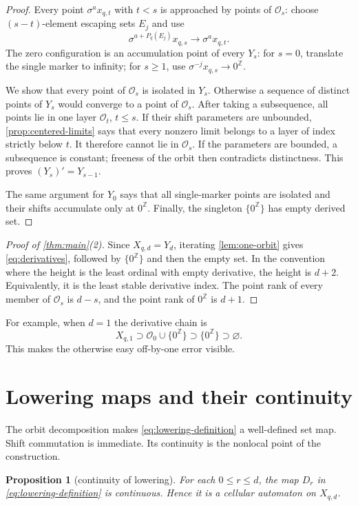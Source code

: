 \documentclass[11pt,a4paper]{amsart}
\newtheorem{proposition}[theorem]{Proposition}
\theoremstyle{definition}
\theoremstyle{remark}
\newcommand{\Z}{\mathbb Z}
\newcommand{\cO}{\mathcal O}
\newcommand{\zero}{0^{\Z}}
\newcommand{\pq}{P_q}
\begin{document}
\begin{proof}
Every point $\sigma^a x_{q,t}$ with $t<s$ is approached by points of
$\cO_s$: choose $(s-t)$-element escaping sets $E_j$ and use
\[
 \sigma^{a+\pq(E_j)}x_{q,s}\longrightarrow\sigma^a x_{q,t}.
\]
The zero configuration is an accumulation point of every $Y_s$: for
$s=0$, translate the single marker to infinity; for $s\geq1$, use
$\sigma^{-j}x_{q,s}\to\zero$.

We show that every point of $\cO_s$ is isolated in $Y_s$.  Otherwise a
sequence of distinct points of $Y_s$ would converge to a point of $\cO_s$.
After taking a subsequence, all points lie in one layer $\cO_t$, $t\leq s$.
If their shift parameters are unbounded, \cref{prop:centered-limits} says
that every nonzero limit belongs to a layer of index strictly below $t$.
It therefore cannot lie in $\cO_s$.  If the parameters are bounded, a
subsequence is constant; freeness of the orbit then contradicts distinctness.
This proves $(Y_s)'=Y_{s-1}$.

The same argument for $Y_0$ says that all single-marker points are isolated
and their shifts accumulate only at $\zero$.  Finally, the singleton
$\{\zero\}$ has empty derived set.
\end{proof}

\begin{proof}[Proof of \cref{thm:main}(2)]
Since $X_{q,d}=Y_d$, iterating \cref{lem:one-orbit} gives
\eqref{eq:derivatives}, followed by $\{\zero\}$ and then the empty set.  In
the convention where the height is the least ordinal with empty derivative,
the height is $d+2$.  Equivalently, it is the least stable derivative index.
The point rank of every member of $\cO_s$ is $d-s$, and the point rank of
$\zero$ is $d+1$.
\end{proof}

For example, when $d=1$ the derivative chain is
\[
 X_{q,1}\supset \cO_0\cup\{\zero\}
 \supset\{\zero\}\supset\varnothing.
\]
This makes the otherwise easy off-by-one error visible.

\section{Lowering maps and their continuity}

The orbit decomposition makes \eqref{eq:lowering-definition} a well-defined
set map.  Shift commutation is immediate.  Its continuity is the nonlocal
point of the construction.

\begin{proposition}[continuity of lowering]\label{prop:lowering-continuity}
For each $0\leq r\leq d$, the map $D_r$ in
\eqref{eq:lowering-definition} is continuous.  Hence it is a cellular
automaton on $X_{q,d}$.
\end{proposition}
\end{document}
